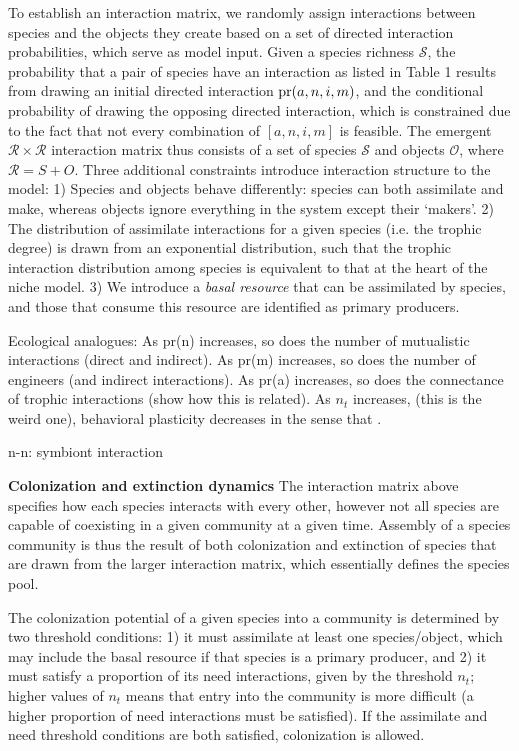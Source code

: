 \documentclass[twocolumn,preprintnumbers,amsmath,amssymb,superscriptaddress]{revtex4}
\begin{document}
To establish an interaction matrix, we randomly assign interactions between species and the objects they create based on a set of directed interaction probabilities, which serve as model input. 
Given a species richness $\mathcal S$, the probability that a pair of species have an interaction as listed in Table 1 results from drawing an initial directed interaction ${\rm pr}(a,n,i,m)$, and the conditional probability of drawing the opposing directed interaction, which is constrained due to the fact that not every combination of $[a,n,i,m]$ is feasible.
The emergent $\mathcal R \times \mathcal R$ interaction matrix thus consists of a set of species $\mathcal S$ and objects $\mathcal O$, where $\mathcal R = S + O$. 
Three additional constraints introduce interaction structure to the model:
1) Species and objects behave differently: species can both assimilate and make, whereas objects ignore everything in the system except their `makers'.
2) The distribution of assimilate interactions for a given species (i.e. the trophic degree) is drawn from an exponential distribution, such that the trophic interaction distribution among species is equivalent to that at the heart of the niche model.
3) We introduce a \emph{basal resource} that can be assimilated by species, and those that consume this resource are identified as primary producers.

Ecological analogues: 
As pr(n) increases, so does the number of mutualistic interactions (direct and indirect).
As pr(m) increases, so does the number of engineers (and indirect interactions).
As pr(a) increases, so does the connectance of trophic interactions (show how this is related).
As $n_t$ increases, (this is the weird one), behavioral plasticity decreases in the sense that .

n-n: symbiont interaction


{\bf Colonization and extinction dynamics}
The interaction matrix above specifies how each species interacts with every other, however not all species are capable of coexisting in a given community at a given time.
Assembly of a species community is thus the result of both colonization and extinction of species that are drawn from the larger interaction matrix, which essentially defines the species pool.

The colonization potential of a given species into a community is determined by two threshold conditions:
1) it must assimilate at least one species/object, which may include the basal resource if that species is a primary producer, and
2) it must satisfy a proportion of its need interactions, given by the threshold $n_t$; higher values of $n_t$ means that entry into the community is more difficult (a higher proportion of need interactions must be satisfied).
If the assimilate and need threshold conditions are both satisfied, colonization is allowed.
\end{document}

